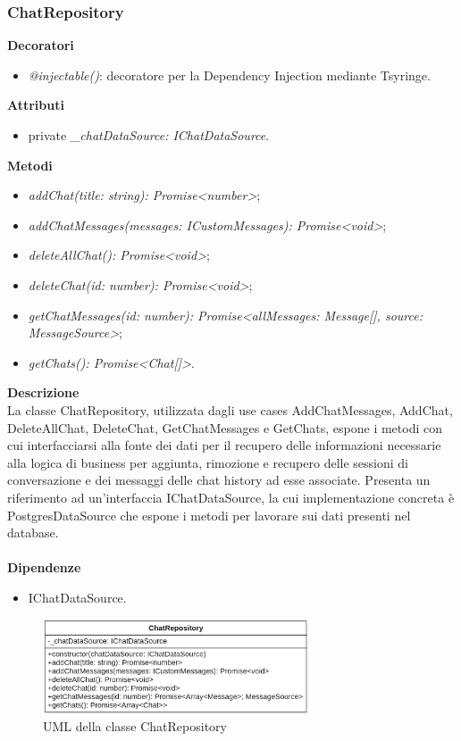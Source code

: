 \newpage

\subsubsection{ChatRepository}
\textbf{Decoratori}
\begin{itemize}
    \item \textit{@injectable()}: decoratore per la Dependency Injection mediante Tsyringe.
\end{itemize}
\textbf{Attributi}
\begin{itemize}
    \item private \textit{\_chatDataSource: IChatDataSource}.
\end{itemize}
\textbf{Metodi}
\begin{itemize}[itemsep=-4pt]
    \item \textit{addChat(title: string): Promise<number>};
    \item \textit{addChatMessages(messages: ICustomMessages): Promise<void>};
    \item \textit{deleteAllChat(): Promise<void>};
    \item \textit{deleteChat(id: number): Promise<void>};
    \item \textit{getChatMessages(id: number): Promise<allMessages: Message[], source: MessageSource>};
    \item \textit{getChats(): Promise<Chat[]>}.
\end{itemize}
\textbf{Descrizione}\\
La classe ChatRepository, utilizzata dagli use cases AddChatMessages, AddChat, DeleteAllChat, DeleteChat, GetChatMessages e GetChats, espone i metodi con cui interfacciarsi alla fonte dei dati per il recupero delle informazioni necessarie alla logica di business per aggiunta, rimozione e recupero delle sessioni di conversazione e dei messaggi delle chat history ad esse associate. Presenta un riferimento ad un'interfaccia IChatDataSource, la cui implementazione concreta è PostgresDataSource che espone i metodi per lavorare sui dati presenti nel database.\\ \\
\textbf{Dipendenze}
\begin{itemize}
    \item IChatDataSource.
\end{itemize}

\begin{figure}[h!]
    \centering  
    \includegraphics[width=0.7\textwidth]{ChatRepository.png}
    \caption{UML della classe ChatRepository}
\end{figure}

